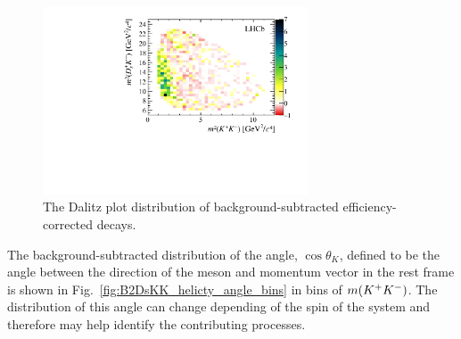 \begin{figure}[!h]
    \centering
    \includegraphics[width=0.7\textwidth]{figs/B2DsKK/Dalitz_plot_sweighted.pdf}
    \caption{The Dalitz plot distribution of background-subtracted efficiency-corrected \decay{\Bp}{\Dsp\Kp\Km} decays.}
    \label{fig:B2DsKK_Dalitzplot}   
\end{figure}



The background-subtracted distribution of the angle, $\cos{\theta_{K}}$, defined to be the angle between the direction of the \Kp meson and \Bp momentum vector in the \Kp\Km rest frame is shown in Fig.~\ref{fig:B2DsKK_helicty_angle_bins} in bins of $m({{K}^+}{{K}^-})$. The distribution of this angle can change depending of the spin of the \Kp\Km system and therefore may help identify the contributing processes. 





